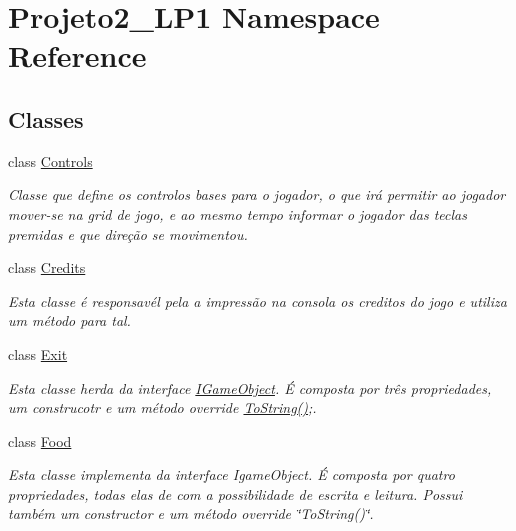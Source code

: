 \hypertarget{namespace_projeto2___l_p1}{}\section{Projeto2\+\_\+\+L\+P1 Namespace Reference}
\label{namespace_projeto2___l_p1}
\subsection*{Classes}
\begin{DoxyCompactItemize}
\item 
class \mbox{\hyperlink{class_projeto2___l_p1_1_1_controls}{Controls}}
\begin{DoxyCompactList}\small\item\em Classe que define os controlos bases para o jogador, o que irá permitir ao jogador mover-\/se na grid de jogo, e ao mesmo tempo informar o jogador das teclas premidas e que direção se movimentou. ~\newline
\end{DoxyCompactList}\item 
class \mbox{\hyperlink{class_projeto2___l_p1_1_1_credits}{Credits}}
\begin{DoxyCompactList}\small\item\em Esta classe é responsavél pela a impressão na consola os creditos do jogo e utiliza um método para tal. \end{DoxyCompactList}\item 
class \mbox{\hyperlink{class_projeto2___l_p1_1_1_exit}{Exit}}
\begin{DoxyCompactList}\small\item\em Esta classe herda da interface \mbox{\hyperlink{interface_projeto2___l_p1_1_1_i_game_object}{I\+Game\+Object}}. É composta por três propriedades, um construcotr e um método override \mbox{\hyperlink{class_projeto2___l_p1_1_1_exit_a45f6b4cb0db046f8b31859370aff2f92}{To\+String()}};. \end{DoxyCompactList}\item 
class \mbox{\hyperlink{class_projeto2___l_p1_1_1_food}{Food}}
\begin{DoxyCompactList}\small\item\em Esta classe implementa da interface Igame\+Object. É composta por quatro propriedades, todas elas de com a possibilidade de escrita e leitura. Possui também um constructor e um método override \char`\"{}\+To\+String()\char`\"{}. \end{DoxyCompactList}\item 

\end{DoxyCompactItemize}
